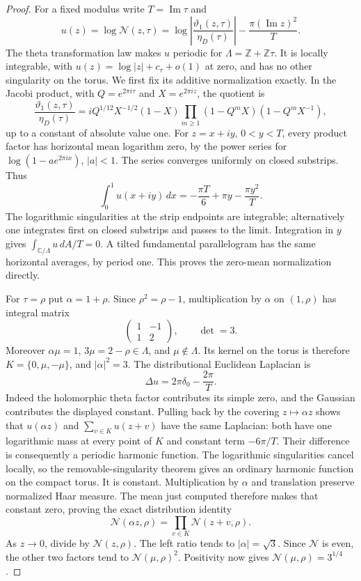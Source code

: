 \begin{proof}
For a fixed modulus write \(T=\operatorname{Im}\tau\) and
\[
 u(z)=\log\mathcal N(z,\tau)
 =\log\left|\frac{\vartheta_1(z,\tau)}{\eta_D(\tau)}\right|
       -\frac{\pi(\operatorname{Im}z)^2}{T}.
\]
The theta transformation law makes \(u\) periodic for
\(\Lambda=\mathbb Z+\mathbb Z\tau\). It is locally integrable,
with \(u(z)=\log|z|+c_\tau+o(1)\) at zero, and has no other
singularity on the torus. We first fix its additive normalization
exactly. In the Jacobi product, with
\(Q=e^{2\pi i\tau}\) and \(X=e^{2\pi iz}\), the quotient is
\[
 \frac{\vartheta_1(z,\tau)}{\eta_D(\tau)}
 =iQ^{1/12}X^{-1/2}(1-X)
       \prod_{m\ge1}(1-Q^mX)(1-Q^mX^{-1}),
\]
up to a constant of absolute value one. For
\(z=x+iy\), \(0<y<T\), every product factor has horizontal
mean logarithm zero, by the power series for
\(\log(1-ae^{2\pi ix})\), \(|a|<1\). The series converges
uniformly on closed substrips. Thus
\[
 \int_0^1u(x+iy)\,dx
       =-\frac{\pi T}{6}+\pi y-\frac{\pi y^2}{T}.
\]
The logarithmic singularities at the strip endpoints are
integrable; alternatively one integrates first on closed substrips
and passes to the limit. Integration in \(y\) gives
\(\int_{\mathbb C/\Lambda}u\,dA/T=0\). A tilted fundamental
parallelogram has the same horizontal averages, by period one.
This proves the zero-mean normalization directly.

For \(\tau=\rho\) put \(\alpha=1+\rho\). Since
\(\rho^2=\rho-1\), multiplication by \(\alpha\) on
\((1,\rho)\) has integral matrix
\[
 \begin{pmatrix}1&-1\\1&2\end{pmatrix},\qquad \det=3.
\]
Moreover \(\alpha\mu=1\), \(3\mu=2-\rho\in\Lambda\),
and \(\mu\notin\Lambda\). Its kernel on the torus is therefore
\(K=\{0,\mu,-\mu\}\), and \(|\alpha|^2=3\).
The distributional Euclidean Laplacian is
\[
 \Delta u=2\pi\delta_0-\frac{2\pi}{T}.
\]
Indeed the holomorphic theta factor contributes its simple zero,
and the Gaussian contributes the displayed constant. Pulling back
by the covering \(z\mapsto\alpha z\) shows that
\(u(\alpha z)\) and \(\sum_{v\in K}u(z+v)\) have the same
Laplacian: both have one logarithmic mass at every point of \(K\)
and constant term \(-6\pi/T\). Their difference is consequently
a periodic harmonic function. The logarithmic singularities cancel
locally, so the removable-singularity theorem gives an ordinary
harmonic function on the compact torus. It is constant.
Multiplication by \(\alpha\) and translation preserve normalized
Haar measure. The mean just computed therefore makes that constant
zero, proving the exact distribution identity
\[
 \mathcal N(\alpha z,\rho)
       =\prod_{v\in K}\mathcal N(z+v,\rho).
\]
As \(z\to0\), divide by \(\mathcal N(z,\rho)\). The left
ratio tends to \(|\alpha|=\sqrt3\). Since \(\mathcal N\) is
even, the other two factors tend to \(\mathcal N(\mu,\rho)^2\).
Positivity now gives \(\mathcal N(\mu,\rho)=3^{1/4}\).


\end{proof}
